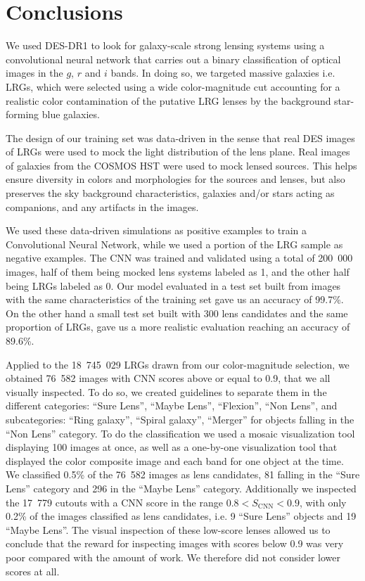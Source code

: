 \documentclass[tradiabstract,twocolumn]{aa}
\begin{document}
\section{Conclusions}\label{sec:conclu}

We used DES-DR1 to look for galaxy-scale strong lensing systems using a convolutional neural network that carries out a binary classification of optical images in the  $g$, $r$ and $i$ bands. In doing so, we targeted massive galaxies i.e. LRGs, which were selected using a wide color-magnitude cut accounting for a realistic color contamination of the putative LRG lenses by the background star-forming blue galaxies.

The design of our training set was data-driven in the sense that real DES images of LRGs were used to mock the light distribution of the lens plane. Real images of galaxies from the COSMOS HST were used to mock lensed sources. This helps ensure diversity in colors and morphologies for the sources and lenses, but also preserves the sky background characteristics, galaxies and/or stars acting as companions, and any artifacts in the images.

We used these data-driven simulations as positive examples to train a Convolutional Neural Network, while we used a portion of the LRG sample as negative examples. The CNN was trained and validated using a total of 200~000 images, half of them being mocked lens systems labeled as 1, and the other half being LRGs labeled as 0. Our model evaluated in a test set built from images with the same characteristics of the training set gave us an accuracy of 99.7\%. On the other hand a small test set built with 300 lens candidates and the same proportion of LRGs, gave us a more realistic evaluation reaching an accuracy of 89.6\%. 


Applied to the 18~745~029 LRGs drawn from our color-magnitude selection, we obtained 76~582 images with CNN scores above or equal to 0.9, that we all visually inspected. To do so, we created guidelines to separate them in the different categories: “Sure Lens”, “Maybe Lens”, “Flexion”, “Non Lens”, and subcategories: “Ring galaxy”, “Spiral galaxy”, “Merger” for objects falling in the “Non Lens” category. To do the classification we used a mosaic visualization tool displaying 100 images at once, as well as a one-by-one visualization tool that displayed the color composite image and each band for one object at the time. We classified 0.5\% of the 76~582 images as lens candidates, 81 falling in the “Sure Lens” category and 296 in the “Maybe Lens” category. Additionally we inspected the 17~779 cutouts with a CNN score in the range $0.8 < S_{\text{CNN}} < 0.9$, with only 0.2\% of the images classified as lens candidates, i.e. 9 “Sure Lens” objects and 19 “Maybe Lens”. The visual inspection of these low-score lenses allowed us to conclude that the reward for inspecting images with scores below 0.9 was very poor compared with the amount of work. We therefore did not consider lower scores at all. 
\end{document}
